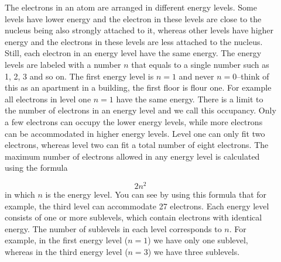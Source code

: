 \documentclass[main.tex]{subfiles}
\begin{document}
\begin{description}
\item[] 
The electrons in an atom are arranged in different energy levels. Some levels have lower energy and the electron in these levels are close to the nucleus being also strongly attached to it, whereas other levels have higher energy and the electrons in these levels are less attached to the nucleus. Still, each electron in an energy level have the same energy. The energy levels are labeled with a number $n$ that equals to a single number such as 1, 2, 3 and so on. The first energy level is $n=1$ and never $n=0$--think of this as an apartment in a building, the first floor is flour one. For example all electrons in level one $n=1$ have the same energy. There is a limit to the number of electrons in an energy level and we call this occupancy. Only a few electrons can occupy the lower energy levels, while more electrons can be accommodated in higher energy levels.  Level one can only fit two electrons, whereas level two can fit a total number of eight electrons. The maximum number of electrons allowed in any energy level is calculated using the formula 

%
%
% 
\begin{equation}
2n^2 
\end{equation}
in which $n$ is the energy level. You can see by using this formula that for example, the third level can accommodate 27 electrons.
Each energy level consists of one or more sublevels, which contain electrons with identical energy. The number of sublevels in each level corresponds to $n$. For example, in the first energy level ($n=1$) we have only one sublevel, whereas in the third energy level ($n=3$) we have three sublevels.



\end{description}
\end{document}
